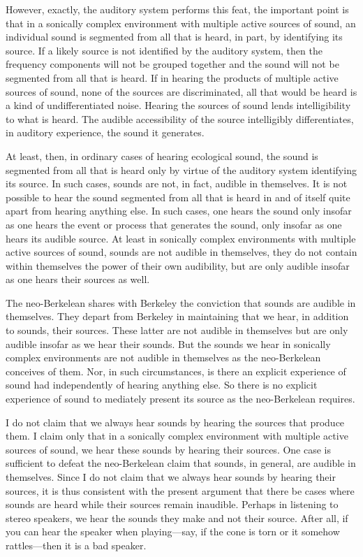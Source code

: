 However, exactly, the auditory system performs this feat, the important point is that in a sonically complex environment with multiple active sources of sound, an individual sound is segmented from all that is heard, in part, by identifying its source. If a likely source is not identified by the auditory system, then the frequency components will not be grouped together and the sound will not be segmented from all that is heard. If in hearing the products of multiple active sources of sound, none of the sources are discriminated, all that would be heard is a kind of undifferentiated noise. Hearing the sources of sound lends intelligibility to what is heard. The audible accessibility of the source intelligibly differentiates, in auditory experience, the sound it generates.

At least, then, in ordinary cases of hearing ecological sound, the sound is segmented from all that is heard only by virtue of the auditory system identifying its source. In such cases, sounds are not, in fact, audible in themselves. It is not possible to hear the sound segmented from all that is heard in and of itself quite apart from hearing anything else. In such cases, one hears the sound only insofar as one hears the event or process that generates the sound, only insofar as one hears its audible source. At least in sonically complex environments with multiple active sources of sound, sounds are not audible in themselves, they do not contain within themselves the power of their own audibility, but are only audible insofar as one hears their sources as well. 

The neo-Berkelean shares with Berkeley the conviction that sounds are audible in themselves. They depart from Berkeley in maintaining that we hear, in addition to sounds, their sources. These latter are not audible in themselves but are only audible insofar as we hear their sounds. But the sounds we hear in sonically complex environments are not audible in themselves as the neo-Berkelean conceives of them. Nor, in such circumstances, is there an explicit experience of sound had independently of hearing anything else. So there is no explicit experience of sound to mediately present its source as the neo-Berkelean requires.

I do not claim that we always hear sounds by hearing the sources that produce them. I claim only that in a sonically complex environment with multiple active sources of sound, we hear these sounds by hearing their sources. One case is sufficient to defeat the neo-Berkelean claim that sounds, in general, are audible in themselves. Since I do not claim that we always hear sounds by hearing their sources, it is thus consistent with the present argument that there be cases where sounds are heard while their sources remain inaudible. Perhaps in listening to stereo speakers, we hear the sounds they make and not their source. After all, if you can hear the speaker when playing---say, if the cone is torn or it somehow rattles---then it is a bad speaker.

